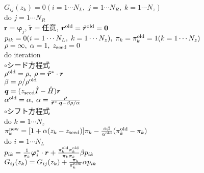 \documentclass[12pt,titlepage]{jarticle}
\begin{document}
\noindent
$G_{i j}(z_k) = 0 (i=1 \cdots N_L,\; j = 1 \cdots N_R,\; k=1 \cdots N_z)$
\\
do $j = 1 \cdots N_R$
\\\hspace{0.5cm}
${\boldsymbol r} = {\boldsymbol \varphi_j}$, ${\tilde {\boldsymbol r}} = $任意,
${\boldsymbol r}^{\rm old} = {\tilde {\boldsymbol r}}^{\rm old} = {\bf 0}$
\\\hspace{0.5cm}
$p_{i k} = 0(i=1 \cdots N_L,\; k=1 \cdots N_z),\; \pi_k=\pi_k^{\rm old} = 1(k=1 \cdots N_z)$ 
\\\hspace{0.5cm}
$\rho = \infty,\; \alpha = 1,\; z_{\rm seed}=0$ 
\\\hspace{0.5cm}
do iteration
\\\hspace{1.0cm}
$\circ$シード方程式
\\\hspace{1.0cm}
$\rho^{\rm old} = \rho,\; \rho = {\tilde {\boldsymbol r}}^* \cdot {\boldsymbol r}$
\\\hspace{1.0cm}
$\beta = \rho / \rho^{\rm old}$
\\\hspace{1.0cm}
${\boldsymbol q} = (z_{\rm seed} {\hat I} - {\hat H}){\boldsymbol r}$
\\\hspace{1.0cm}
$\alpha^{\rm old} = \alpha,\; 
\alpha = \frac{\rho}{{\tilde {\boldsymbol r}}^*\cdot{\boldsymbol q} - \beta \rho / \alpha }$
\\\hspace{1.0cm}
$\circ$シフト方程式
\\\hspace{1.0cm}
do $k = 1 \cdots N_z$
\\\hspace{1.5cm}
$\pi_k^{\rm new} = [1+\alpha(z_k-z_{\rm seed})]\pi_k - \frac{\alpha \beta}{\alpha^{\rm old}}(\pi_k^{\rm old} - \pi_k)$
\\\hspace{1.5cm}
do $i = 1 \cdots N_L$
\\\hspace{2.0cm}
$p_{i k} = \frac{1}{\pi_k} {\boldsymbol \varphi}_i^* \cdot {\boldsymbol r} + 
\frac{\pi^{\rm old}_k \pi^{\rm old}_k}{\pi_k \pi_k} \beta p_{i k}$
\\\hspace{2.0cm}
$G_{i j}(z_k) = G_{i j}(z_k) + \frac{\pi_k}{\pi_k^{\rm new}} \alpha p_{i k}$
\end{document}
